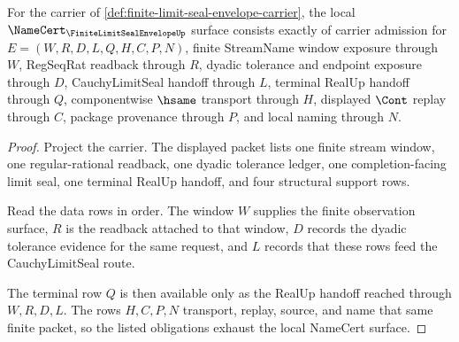 \begin{theorem}
\label{thm:finite-limit-seal-envelope-namecert-obligations}
For the carrier of \autoref{def:finite-limit-seal-envelope-carrier}, the local $\NameCert_{\FiniteLimitSealEnvelopeUp}$ surface consists exactly of carrier admission for $E=(W,R,D,L,Q,H,C,P,N)$, finite StreamName window exposure through $W$, RegSeqRat readback through $R$, dyadic tolerance and endpoint exposure through $D$, CauchyLimitSeal handoff through $L$, terminal RealUp handoff through $Q$, componentwise $\hsame$ transport through $H$, displayed $\Cont$ replay through $C$, package provenance through $P$, and local naming through $N$.
\end{theorem}
\begin{proof}
Project the carrier. The displayed packet lists one finite stream window, one regular-rational readback, one dyadic tolerance ledger, one completion-facing limit seal, one terminal RealUp handoff, and four structural support rows.

Read the data rows in order. The window $W$ supplies the finite observation surface, $R$ is the readback attached to that window, $D$ records the dyadic tolerance evidence for the same request, and $L$ records that these rows feed the CauchyLimitSeal route.

The terminal row $Q$ is then available only as the RealUp handoff reached through $W,R,D,L$. The rows $H,C,P,N$ transport, replay, source, and name that same finite packet, so the listed obligations exhaust the local NameCert surface.
\end{proof}

